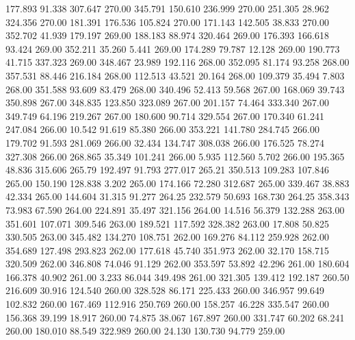  177.893   91.338  307.647       270.00
 345.791  150.610  236.999       270.00
 251.305   28.962  324.356       270.00
 181.391  176.536  105.824       270.00
 171.143  142.505   38.833       270.00
 352.702   41.939  179.197       269.00
 188.183   88.974  320.464       269.00
 176.393  166.618   93.424       269.00
 352.211   35.260    5.441       269.00
 174.289   79.787   12.128       269.00
 190.773   41.715  337.323       269.00
 348.467   23.989  192.116       268.00
 352.095   81.174   93.258       268.00
 357.531   88.446  216.184       268.00
 112.513   43.521   20.164       268.00
 109.379   35.494    7.803       268.00
 351.588   93.609   83.479       268.00
 340.496   52.413   59.568       267.00
 168.069   39.743  350.898       267.00
 348.835  123.850  323.089       267.00
 201.157   74.464  333.340       267.00
 349.749   64.196  219.267       267.00
 180.600   90.714  329.554       267.00
 170.340   61.241  247.084       266.00
  10.542   91.619   85.380       266.00
 353.221  141.780  284.745       266.00
 179.702   91.593  281.069       266.00
  32.434  134.747  308.038       266.00
 176.525   78.274  327.308       266.00
 268.865   35.349  101.241       266.00
   5.935  112.560    5.702       266.00
 195.365   48.836  315.606       265.79
 192.497   91.793  277.017       265.21
 350.513  109.283  107.846       265.00
 150.190  128.838    3.202       265.00
 174.166   72.280  312.687       265.00
 339.467   38.883   42.334       265.00
 144.604   31.315   91.277       264.25
 232.579   50.693  168.730       264.25
 358.343   73.983   67.590       264.00
 224.891   35.497  321.156       264.00
  14.516   56.379  132.288       263.00
 351.601  107.071  309.546       263.00
 189.521  117.592  328.382       263.00
  17.808   50.825  330.505       263.00
 345.482  134.270  108.751       262.00
 169.276   84.112  259.928       262.00
 354.689  127.498  293.823       262.00
 177.618   45.740  351.973       262.00
  32.170  158.715  320.509       262.00
 346.808   74.046   91.129       262.00
 353.597   53.892   42.296       261.00
 180.604  166.378   40.902       261.00
   3.233   86.044  349.498       261.00
 321.305  139.412  192.187       260.50
 216.609   30.916  124.540       260.00
 328.528   86.171  225.433       260.00
 346.957   99.649  102.832       260.00
 167.469  112.916  250.769       260.00
 158.257   46.228  335.547       260.00
 156.368   39.199   18.917       260.00
  74.875   38.067  167.897       260.00
 331.747   60.202   68.241       260.00
 180.010   88.549  322.989       260.00
  24.130  130.730   94.779       259.00
